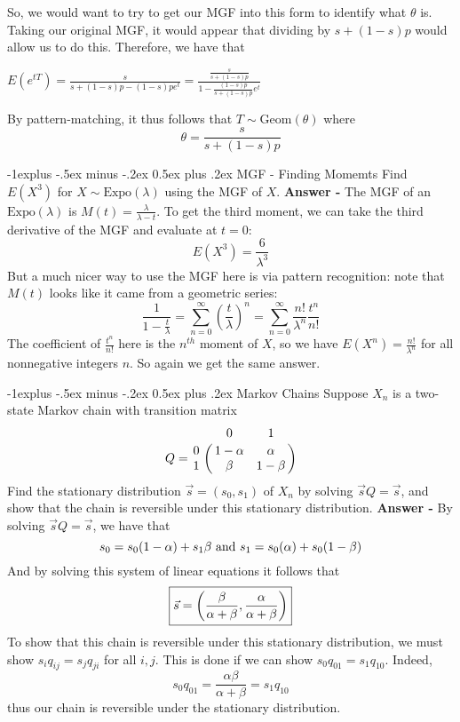 \documentclass[10pt,landscape]{article}
\makeatletter
\theoremstyle{definition}
\newcommand{\Expo}{\textrm{Expo}}
\newcommand{\Geom}{\textrm{Geom}}
\renewcommand{\subsection}{\@startsection{subsection}{2}{0mm}%
                                {-1explus -.5ex minus -.2ex}%
                                {0.5ex plus .2ex}%
                                {\normalfont\normalsize\bfseries}}
\makeatother
\begin{document}
\begin{multicols}{3}
    So, we would want to try to get our MGF into this form to identify what $\theta$ is. Taking our original MGF, it would appear that dividing by $s+(1-s)p$ would allow us to do this. Therefore, we have that \begin{center}
    $E(e^{tT}) = \displaystyle\frac{s}{s+(1-s)p - (1-s)pe^t} = \frac{\frac{s}{s+(1-s)p}}{1-\frac{(1-s)p}{s+(1-s)p}e^t}$
    \end{center}
    
    By pattern-matching, it thus follows that $\boxed{T \sim \Geom(\theta)}$ where \[\boxed{\theta = \displaystyle\frac{s}{s+(1-s)p}}\]

\subsection{MGF - Finding Momemts}
Find $E(X^3)$ for $X \sim \Expo(\lambda)$ using the MGF of $X$. \textbf{Answer - } The MGF of an $\Expo(\lambda)$ is $M(t) = \frac{\lambda}{\lambda-t}$. To get the third moment, we can take the third derivative of the MGF and evaluate at $t=0$: 
\[\boxed{E(X^3) = \frac{6}{\lambda^3}}\]
But a much nicer way to use the MGF here is via pattern recognition: note that $M(t)$ looks like it came from a geometric series:
\[\frac{1}{1-\frac{t}{\lambda}} = \sum^{\infty}_{n=0} \left(\frac{t}{\lambda}\right)^n = \sum^{\infty}_{n=0} \frac{n!}{\lambda^n} \frac{t^n}{n!}\] The coefficient of $\frac{t^n}{n!}$ here is the $n^{th}$ moment of $X$, so we have $E(X^n) = \frac{n!}{\lambda^n}$ for all nonnegative integers $n$. So again we get the same answer.

\subsection{Markov Chains}
Suppose $X_n$ is a two-state Markov chain with transition matrix \[
Q = \bordermatrix{~ & 0 & 1 \cr
                  0 & 1-\alpha & \alpha \cr
                  1 & \beta & 1-\beta \cr}
\] Find the stationary distribution $\vec{s} = (s_0, s_1)$ of $X_n$ by solving $\vec{s} Q = \vec{s}$, and show that the chain is reversible under this stationary distribution. \textbf{Answer - } By solving $\vec{s}Q = \vec{s}$, we have that \[s_0 = s_0(1-\alpha) + s_1 \beta \textnormal{ and } s_1 = s_0(\alpha) + s_0(1-\beta)\] And by solving this system of linear equations it follows that \[\boxed{\vec{s} = \displaystyle\bigg{(}\frac{\beta}{\alpha+\beta}, \frac{\alpha}{\alpha+\beta}\bigg{)}}\] To show that this chain is reversible under this stationary distribution, we must show $s_i q_{ij} = s_j q_{ji}$ for all $i, j$. This is done if we can show $s_0 q_{01} = s_1 q_{10}$. Indeed, \[s_0  q_{01}  = \frac{\alpha\beta}{\alpha+\beta} = s_1 q_{10}\] thus our chain is reversible under the stationary distribution.


\end{multicols}
\end{document}
